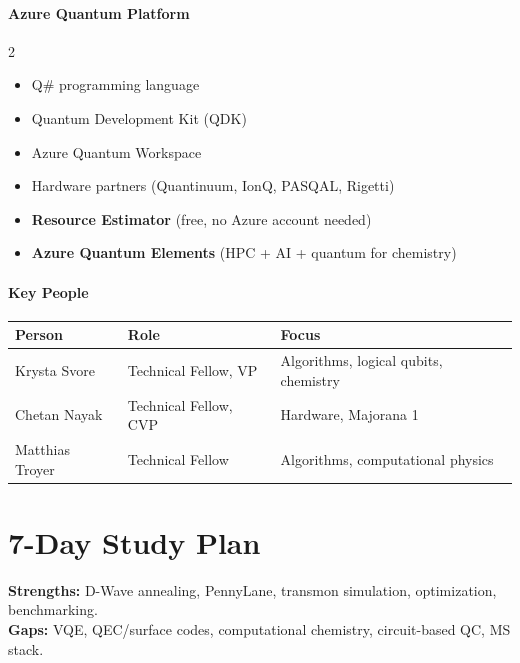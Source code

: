 \documentclass[11pt,a4paper]{article}
\begin{document}
\subsection{Azure Quantum Platform}
\begin{multicols}{2}
\begin{itemize}
    \item Q\# programming language
    \item Quantum Development Kit (QDK)
    \item Azure Quantum Workspace
    \item Hardware partners (Quantinuum, IonQ, PASQAL, Rigetti)
    \item \textbf{Resource Estimator} (free, no Azure account needed)
    \item \textbf{Azure Quantum Elements} (HPC + AI + quantum for chemistry)
\end{itemize}
\end{multicols}

\subsection{Key People}
\begin{table}[H]
\centering
\begin{tabular}{lll}
\toprule
\textbf{Person} & \textbf{Role} & \textbf{Focus} \\
\midrule
Krysta Svore & Technical Fellow, VP & Algorithms, logical qubits, chemistry \\
Chetan Nayak & Technical Fellow, CVP & Hardware, Majorana 1 \\
Matthias Troyer & Technical Fellow & Algorithms, computational physics \\
\bottomrule
\end{tabular}
\end{table}


\newpage
\part{7-Day Study Plan}

\begin{importantbox}
\textbf{Strengths:} D-Wave annealing, PennyLane, transmon simulation, optimization, benchmarking.\\
\textbf{Gaps:} VQE, QEC/surface codes, computational chemistry, circuit-based QC, MS stack.
\end{importantbox}
\end{document}
